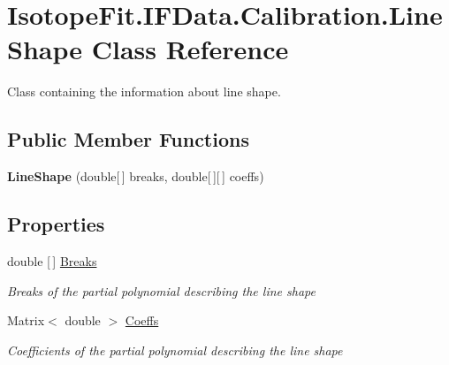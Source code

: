 \hypertarget{class_isotope_fit_1_1_i_f_data_1_1_calibration_1_1_line_shape}{}\section{Isotope\+Fit.\+I\+F\+Data.\+Calibration.\+Line\+Shape Class Reference}
\label{class_isotope_fit_1_1_i_f_data_1_1_calibration_1_1_line_shape}


Class containing the information about line shape.  


\subsection*{Public Member Functions}
\begin{DoxyCompactItemize}
\item 
\mbox{\label{class_isotope_fit_1_1_i_f_data_1_1_calibration_1_1_line_shape_ab5ed4d295ead4741f309d80fee17addc}} 
{\bfseries Line\+Shape} (double\mbox{[}$\,$\mbox{]} breaks, double\mbox{[}$\,$\mbox{]}\mbox{[}$\,$\mbox{]} coeffs)
\end{DoxyCompactItemize}
\subsection*{Properties}
\begin{DoxyCompactItemize}
\item 
double \mbox{[}$\,$\mbox{]} \hyperlink{class_isotope_fit_1_1_i_f_data_1_1_calibration_1_1_line_shape_a447511120da7a7c67677aeb723cffd77}{Breaks}
\begin{DoxyCompactList}\small\item\em Breaks of the partial polynomial describing the line shape \end{DoxyCompactList}\item 
Matrix$<$ double $>$ \hyperlink{class_isotope_fit_1_1_i_f_data_1_1_calibration_1_1_line_shape_a8892e37963113bc557f3324a10ff82a0}{Coeffs}
\begin{DoxyCompactList}\small\item\em Coefficients of the partial polynomial describing the line shape \end{DoxyCompactList}\end{DoxyCompactItemize}


